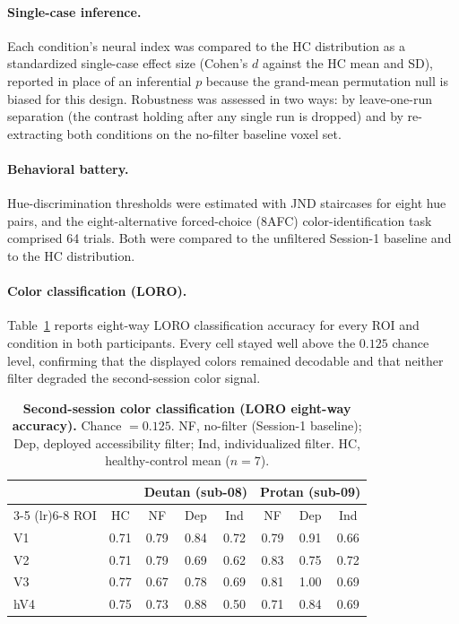 \paragraph{Single-case inference.}
Each condition's neural index was compared to the HC distribution as a standardized single-case effect size (Cohen's $d$ against the HC mean and SD), reported in place of an inferential $p$ because the grand-mean permutation null is biased for this design. Robustness was assessed in two ways: by leave-one-run separation (the contrast holding after any single run is dropped) and by re-extracting both conditions on the no-filter baseline voxel set.

\paragraph{Behavioral battery.}
Hue-discrimination thresholds were estimated with JND staircases for eight hue pairs, and the eight-alternative forced-choice (8AFC) color-identification task comprised 64 trials. Both were compared to the unfiltered Session-1 baseline and to the HC distribution.

\paragraph{Color classification (LORO).}
Table~\ref{tab:exp2_loro} reports eight-way LORO classification accuracy for every ROI and condition in both participants. Every cell stayed well above the $0.125$ chance level, confirming that the displayed colors remained decodable and that neither filter degraded the second-session color signal.

\begin{table}[tb]
  \centering
  \caption{\textbf{Second-session color classification (LORO eight-way accuracy).} Chance $= 0.125$. NF, no-filter (Session-1 baseline); Dep, deployed accessibility filter; Ind, individualized filter. HC, healthy-control mean ($n = 7$).}
  \label{tab:exp2_loro}
  \begin{tabular}{lccccccc}
    \toprule
     & & \multicolumn{3}{c}{Deutan (sub-08)} & \multicolumn{3}{c}{Protan (sub-09)} \\
    \cmidrule(lr){3-5} \cmidrule(lr){6-8}
    ROI & HC & NF & Dep & Ind & NF & Dep & Ind \\
    \midrule
    V1  & 0.71 & 0.79 & 0.84 & 0.72 & 0.79 & 0.91 & 0.66 \\
    V2  & 0.71 & 0.79 & 0.69 & 0.62 & 0.83 & 0.75 & 0.72 \\
    V3  & 0.77 & 0.67 & 0.78 & 0.69 & 0.81 & 1.00 & 0.69 \\
    hV4 & 0.75 & 0.73 & 0.88 & 0.50 & 0.71 & 0.84 & 0.69 \\
    \bottomrule
  \end{tabular}
\end{table}

